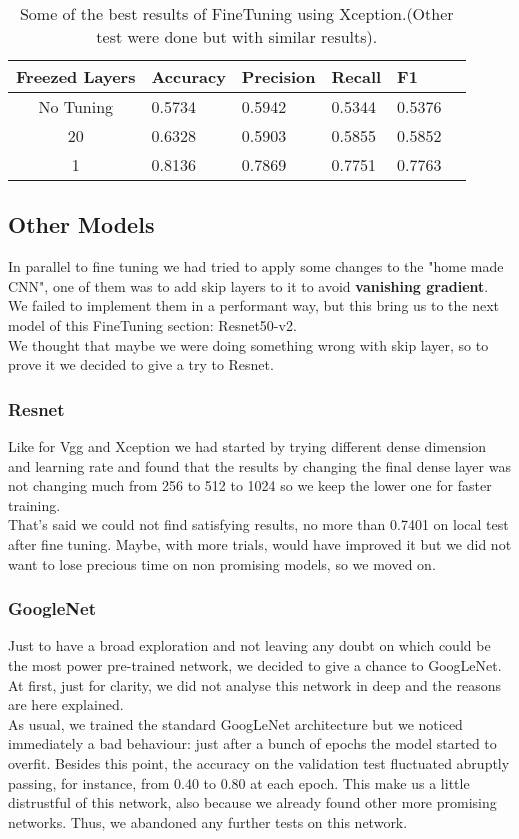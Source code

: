 \documentclass[11pt]{article}
\begin{document}
\begin{table}[ht]
  \centering
  \begin{adjustbox}{width=200}
  \small
  \begin{tabular}{|c|l|l|l|l|l}
  
  \hline \bf Freezed Layers & \bf Accuracy & \bf Precision & \bf Recall & \bf F1 \\ \hline
  No Tuning& 0.5734 & 0.5942 & 0.5344 & 0.5376\\
  20 & 0.6328 & 0.5903 & 0.5855 & 0.5852\\
  1 & 0.8136 & 0.7869 & 0.7751 & 0.7763\\
  \hline
  \end{tabular}
  \end{adjustbox}
  \caption{Some of the best results of FineTuning using Xception.(Other test were done but with similar results).}
  \end{table}
\subsection{Other Models}
In parallel to fine tuning we had tried to apply some changes to the "home made CNN", one of them was to add skip layers to it to avoid \textbf{vanishing gradient}.\\
We failed to implement them in a performant way, but this bring us to the next model of this FineTuning section: Resnet50-v2.\\
We thought that maybe we were doing something wrong with skip layer, so to prove it we decided to give a try to Resnet.
\subsubsection{Resnet}
Like for Vgg and Xception we had started by trying different dense dimension and learning rate and found that the results by changing the final dense layer was not changing much from 256 to 512 to 1024 so we keep the lower one for faster training.\\
That's said we could not find satisfying results, no more than 0.7401 on local test after fine tuning.
Maybe, with more trials, would have improved it but we did not want to lose precious time on non promising models, so we moved on.
\subsubsection{GoogleNet}
Just to have a broad exploration and not leaving any doubt on which could be the most power pre-trained network, we decided to give a chance to GoogLeNet. At first, just for clarity, we did not analyse this network in deep and the reasons are here explained.\\[0.1cm]
As usual, we trained the standard GoogLeNet architecture but we noticed immediately a bad behaviour: just after a bunch of epochs the model started to overfit. Besides this point, the accuracy on the validation test fluctuated abruptly passing, for instance, from 0.40 to 0.80 at each epoch. This make us a little distrustful of this network, also because we already found other more promising networks. Thus, we abandoned any further tests on this network.
\end{document}

